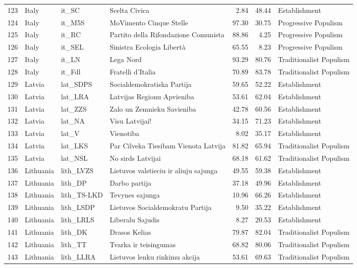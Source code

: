 \begin{longtable}[c]{@{\extracolsep{\fill}}rlllrrl}
		123 & Italy & it\_SC & Scelta Civica & 2.84 & 48.44 & Establishment \\
		124 & Italy & it\_M5S & MoVimento Cinque Stelle & 97.30 & 30.75 & Progressive Populism \\
		125 & Italy & it\_RC & Partito della Rifondazione Comunista & 88.86 & 4.25 & Progressive Populism \\
		126 & Italy & it\_SEL & Sinistra Ecologia Libertà & 65.55 & 8.23 & Progressive Populism \\
		127 & Italy & it\_LN & Lega Nord & 93.29 & 80.76 & Traditionalist Populism \\
		128 & Italy & it\_Fdl & Fratelli d'Italia & 70.89 & 83.78 & Traditionalist Populism \\
		129 & Latvia & lat\_SDPS & Socialdemokratiska Partija & 59.65 & 52.22 & Establishment \\
		130 & Latvia & lat\_LRA & Latvijas Regionu Apvieniba & 53.61 & 62.04 & Establishment \\
		131 & Latvia & lat\_ZZS & Zalo un Zemnieku Savieniba & 42.78 & 60.56 & Establishment \\
		132 & Latvia & lat\_NA & Visu Latvijai! & 34.15 & 71.23 & Establishment \\
		133 & Latvia & lat\_V & Vienotiba & 8.02 & 35.17 & Establishment \\
		134 & Latvia & lat\_LKS & Par Cilveka Tiesibam Vienota Latvija & 81.82 & 65.94 & Traditionalist Populism \\
		135 & Latvia & lat\_NSL & No sirds Latvijai & 68.18 & 61.62 & Traditionalist Populism \\
		136 & Lithuania & lith\_LVZS & Lietuvos valstieciu ir aliuju sajunga & 49.55 & 59.38 & Establishment \\
		137 & Lithuania & lith\_DP & Darbo partija & 37.18 & 49.96 & Establishment \\
		138 & Lithuania & lith\_TS-LKD & Tevynes sajunga & 10.96 & 66.26 & Establishment \\
		139 & Lithuania & lith\_LSDP & Lietuvos Socialdemokratu Partija & 9.50 & 35.22 & Establishment \\
		140 & Lithuania & lith\_LRLS & Liberalu Sajudis & 8.27 & 20.53 & Establishment \\
		141 & Lithuania & lith\_DK & Drasos Kelias & 79.87 & 82.04 & Traditionalist Populism \\
		142 & Lithuania & lith\_TT & Tvarka ir teisingumas & 68.82 & 80.06 & Traditionalist Populism \\
		143 & Lithuania & lith\_LLRA & Lietuvos lenku rinkimu akcija & 53.61 & 69.63 & Traditionalist Populism \\

\end{longtable}
